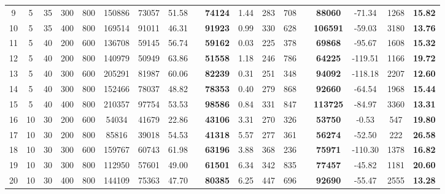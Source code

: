 \documentclass[11pt,nonblindrev,fleqn]{article}
\begin{document}
\begin{table}[H]
\begin{tabular}{cccccccccccccccccc}
9     & 5     & 35    & 300   & 800   & 150886 & 73057 & 51.58  &       & \textbf{74124 } & 1.44  & 283   & 708   &       & \textbf{88060} & -71.34  & 1268  & \textbf{15.82 } \\
10    & 5     & 35    & 400   & 800   & 169514 & 91011 & 46.31  &       & \textbf{91923 } & 0.99  & 330   & 628   &       & \textbf{106591} & -59.03  & 3180  & \textbf{13.76 } \\
11    & 5     & 40    & 200   & 600   & 136708 & 59145 & 56.74  &       & \textbf{59162 } & 0.03  & 225   & 378   &       & \textbf{69868} & -95.67  & 1608  & \textbf{15.32 } \\
12    & 5     & 40    & 200   & 800   & 140979 & 50949 & 63.86  &       & \textbf{51558 } & 1.18  & 246   & 786   &       & \textbf{64225} & -119.51  & 1166  & \textbf{19.72 } \\
13    & 5     & 40    & 300   & 600   & 205291 & 81987 & 60.06  &       & \textbf{82239 } & 0.31  & 251   & 348   &       & \textbf{94092} & -118.18  & 2207  & \textbf{12.60 } \\
14    & 5     & 40    & 300   & 800   & 152466 & 78037 & 48.82  &       & \textbf{78353 } & 0.40  & 279   & 868   &       & \textbf{92660} & -64.54  & 1968  & \textbf{15.44 } \\
15    & 5     & 40    & 400   & 800   & 210357 & 97754 & 53.53  &       & \textbf{98586 } & 0.84  & 331   & 847   &       & \textbf{113725} & -84.97  & 3360  & \textbf{13.31 } \\
16    & 10    & 30    & 200   & 600   & 54034 & 41679 & 22.86  &       & \textbf{43106 } & 3.31  & 270   & 326   &       & \textbf{53750} & -0.53  & 547   & \textbf{19.80 } \\
17    & 10    & 30    & 200   & 800   & 85816 & 39018 & 54.53  &       & \textbf{41318 } & 5.57  & 277   & 361   &       & \textbf{56274} & -52.50  & 222   & \textbf{26.58 } \\
18    & 10    & 30    & 300   & 600   & 159767 & 60743 & 61.98  &       & \textbf{63196 } & 3.88  & 368   & 236   &       & \textbf{75971} & -110.30  & 1378  & \textbf{16.82 } \\
19    & 10    & 30    & 300   & 800   & 112950 & 57601 & 49.00  &       & \textbf{61501 } & 6.34  & 342   & 835   &       & \textbf{77457} & -45.82  & 1181  & \textbf{20.60 } \\
20    & 10    & 30    & 400   & 800   & 144109 & 75363 & 47.70  &       & \textbf{80385 } & 6.25  & 447   & 696   &       & \textbf{92690} & -55.47  & 2555  & \textbf{13.28 } \\

\end{tabular}
\end{table}
\end{document}

